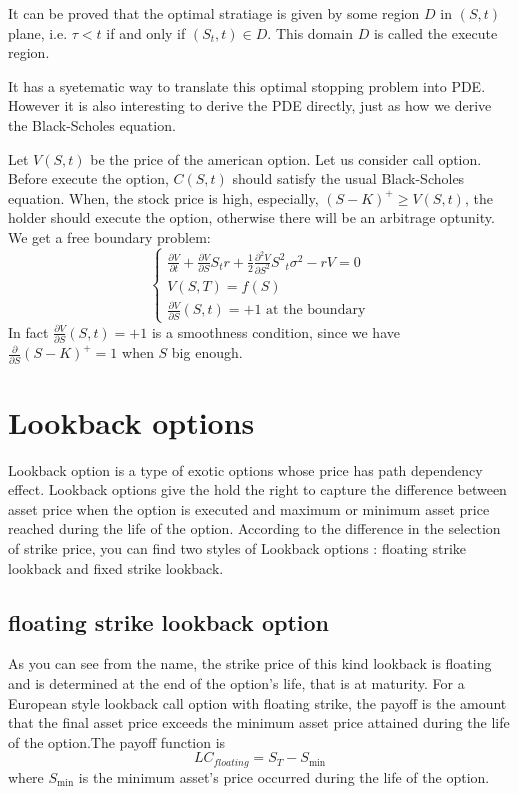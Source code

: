 \documentclass[11pt]{book}
\begin{document}
It can be proved that the optimal stratiage is
given by some region $D$ in $(S,t)$ 
plane, i.e. $\tau<t$ if and only if $(S_t,t)\in D$. This domain $D$ is called
the execute region. 

It has a syetematic way to translate this optimal stopping problem into PDE. 
However it is also interesting to derive the PDE directly, just as how we 
derive the Black-Scholes equation.

Let $V(S,t)$ be the price of the american option. 
Let us consider call option. Before execute the option, $C(S,t)$ should 
satisfy the usual Black-Scholes equation. When, the stock price is high,
especially, $(S-K)^+\geq V(S,t)$, the holder should execute the option, 
otherwise there will be an arbitrage optunity.
We get a free boundary problem:
\[
\begin{cases}
\frac{\partial V}{\partial t} + \frac{\partial V }{\partial S} S_t r + \frac{1}{2} \frac{{\partial}^2 V}{\partial S^2} {S^2}_t {\sigma}^2 -rV=0\\
V(S, T) = f(S)\\
\frac{\partial V}{\partial S}(S,t) = +1 \text{ at the boundary} 
\end{cases}
\]
In fact $\frac{\partial V}{\partial S}(S,t) = +1$ is a smoothness condition, 
since we have $\frac{\partial}{\partial S}(S-K)^+ = 1$ when $S$ big enough.  

\section{Lookback options}

Lookback option is a type of exotic options whose price has path dependency effect. 
Lookback options give the hold the right to capture the difference between asset price when the option is executed and maximum or minimum asset price reached during the life of the option.  According to the difference in the selection of strike price, you can find two styles of Lookback options : floating strike lookback and fixed strike lookback.

\subsection{floating strike lookback option}
As you can see from the name, the strike price of this kind lookback is floating and is determined at the end of the option's life, that is at maturity. For a European style lookback call option with floating strike, the payoff is the amount that the final asset price exceeds the minimum asset price attained during the life of the option.The payoff function is 
\begin{equation}
LC_{floating} = S_T - S_{\min}
\end{equation}
where $S_{\min}$ is the minimum asset's price occurred during the life of the option.
\end{document}
